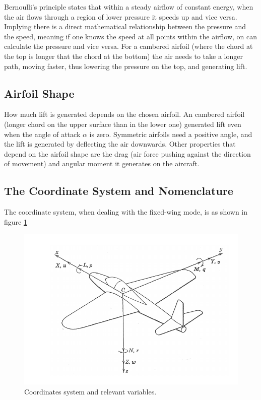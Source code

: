 Bernoulli's principle states that within a steady airflow of constant energy, when the air flows through a region of lower pressure it speeds up and vice versa. Implying there is a direct mathematical relationship between the pressure and the speed, meaning if one knows the speed at all points within the airflow, on can calculate the pressure and vice versa. For a cambered airfoil (where the chord at the top is longer that the chord at the bottom) the air needs to take a longer path, moving faster, thus lowering the pressure on the top, and generating lift.


\subsection{Airfoil Shape}
How much lift is generated depends on the chosen airfoil.
%
An cambered airfoil (longer chord on the upper surface than in the lower one) generated lift even when the angle of attack $\alpha$ is zero.
Symmetric airfoils need a positive angle, and the lift is generated by deflecting the air downwards.
Other properties that depend on the airfoil shape are the drag (air force pushing against the direction of movement) and angular moment it generates on the aircraft. 

\subsection{The Coordinate System and Nomenclature}

The coordinate system, when dealing with the fixed-wing mode, is as shown in figure \ref{fig:coords1}

\begin{figure}
\centering
  \includegraphics[width=\linewidth]{figs/axis1.png}
  \caption{Coordinates system and relevant variables.}
  \label{fig:coords1}
\end{figure}


